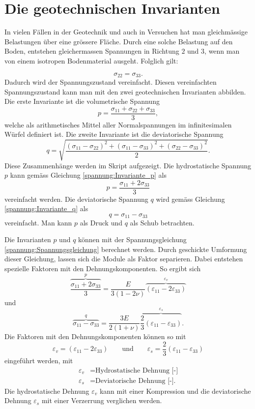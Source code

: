 \section{Die geotechnischen Invarianten\label{spannung:section:Die geotechnischen Invarianten}}
In vielen Fällen in der Geotechnik und auch in Versuchen hat man gleichmässige Belastungen über eine grössere Fläche.
Durch eine solche Belastung auf den Boden, entstehen gleichermassen Spannungen in Richtung $2$ und $3$,
wenn man von einem isotropen Bodenmaterial ausgeht.
Folglich gilt:

\[
\sigma_{22}
=
\sigma_{33}
.
\]
Dadurch wird der Spannungszustand vereinfacht.
Diesen vereinfachten Spannungszustand kann man mit den zwei geotechnischen Invarianten abbilden.
Die erste Invariante ist die volumetrische Spannung
\begin{equation}
p
=
\frac{\sigma_{11}+\sigma_{22}+\sigma_{33}}{3}
\label{spannung:Invariante_p}
,
\end{equation}
welche als arithmetisches Mittel aller Normalspannungen im infinitesimalen Würfel definiert ist.
Die zweite Invariante ist die deviatorische Spannung
\begin{equation}
q
=
\sqrt{\frac{(\sigma_{11}-\sigma_{22})^{2}+(\sigma_{11}-\sigma_{33})^{2}+(\sigma_{22}-\sigma_{33})^{2}}{2}}
\label{spannung:Invariante_q}
.
\end{equation}
Diese Zusammenhänge werden im Skript \cite{spannung:Stoffgesetze-und-numerische-Modellierung-in-der-Geotechnik} aufgezeigt.
Die hydrostatische Spannung $p$ kann gemäss Gleichung \eqref{spannung:Invariante_p} als
\[
p
=
\frac{\sigma_{11}+2\sigma_{33}}{3}
\]
vereinfacht werden.
Die deviatorische Spannung $q$ wird gemäss Gleichung \eqref{spannung:Invariante_q} als
\[
q
=
\sigma_{11}-\sigma_{33}
\]
vereinfacht. Man kann $p$ als Druck und $q$ als Schub betrachten.

Die Invarianten $p$ und $q$ können mit der Spannungsgleichung \eqref{spannung:Spannungsgleichung} berechnet werden.
Durch geschickte Umformung dieser Gleichung, lassen sich die Module als Faktor separieren.
Dabei entstehen spezielle Faktoren mit den Dehnungskomponenten.
So ergibt sich
\[
\overbrace{\frac{\sigma_{11}+2\sigma_{33}}{3}}^{\displaystyle{p}}
=
\frac{E}{3(1-2\nu)} \overbrace{(\varepsilon_{11} - 2\varepsilon_{33})}^{\displaystyle{{\varepsilon_{v}}}}
\]
und
\[
\overbrace{\sigma_{11}-\sigma_{33}}^{\displaystyle{q}}
=
\frac{3E}{2(1+\nu)} \overbrace{\frac{2}{3}(\varepsilon_{11} - \varepsilon_{33})}^{\displaystyle{\varepsilon_{s}}}
.
\]
Die Faktoren mit den Dehnungskomponenten können so mit
\[
\varepsilon_{v}
=
(\varepsilon_{11} - 2\varepsilon_{33})
\qquad
\text{und}
\qquad
\varepsilon_{s}
=
\frac{2}{3}(\varepsilon_{11} - \varepsilon_{33})
\]
eingeführt werden, mit
\begin{align*}
	\varepsilon_{v} &= \text{Hydrostatische Dehnung [-]} \\
	\varepsilon_{s} &= \text{Deviatorische Dehnung [-].}
\end{align*}
Die hydrostatische Dehnung $\varepsilon_{v}$ kann mit einer Kompression und
die deviatorische Dehnung $\varepsilon_{s}$  mit einer Verzerrung verglichen werden.

